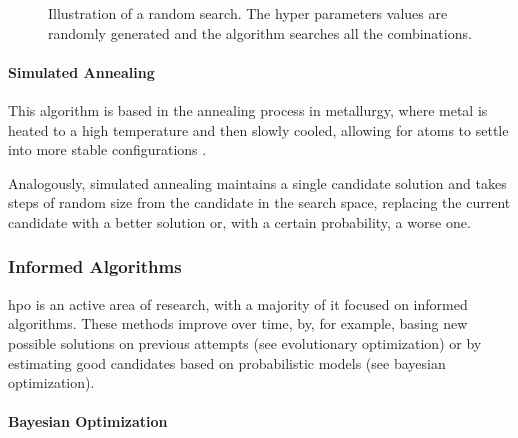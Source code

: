 \begin{figure}[h]
	\centering
    \caption{Illustration of a random search. The hyper parameters values are randomly generated and the algorithm searches all the combinations.}
    \label{random}
 \end{figure}

\paragraph{Simulated Annealing}

This algorithm is based in the annealing process in metallurgy, where metal is heated to a high temperature and then slowly cooled, allowing for atoms to settle into more stable configurations \parencite{elshawi2019automated}.

Analogously, simulated annealing maintains a single candidate solution and takes steps of random size from the candidate in the search space, replacing the current candidate with a better solution or, with a certain probability, a worse one.

\subsubsection{Informed Algorithms}

\acrshort{hpo} is an active area of research, with a majority of it focused on informed algorithms. These methods improve over time, by, for example, basing new possible solutions on previous attempts (see evolutionary optimization) or by estimating good candidates based on probabilistic models (see bayesian optimization).

\paragraph{Bayesian Optimization}

